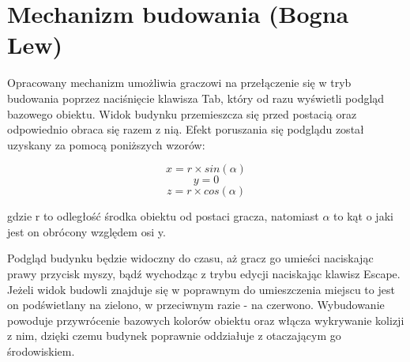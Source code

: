 \section{Mechanizm budowania (Bogna Lew)}

Opracowany mechanizm umożliwia graczowi na przełączenie się w tryb budowania poprzez naciśnięcie klawisza Tab, który od razu
wyświetli podgląd bazowego obiektu. Widok budynku przemieszcza się przed postacią oraz odpowiednio obraca się razem z
nią. Efekt poruszania się podglądu został uzyskany za pomocą poniższych wzorów:

$$ x = r \times sin(\alpha) $$
$$ y = 0 $$
$$ z = r \times cos(\alpha) $$

gdzie r to odległość środka obiektu od postaci gracza, natomiast $\alpha$ to kąt o jaki jest on obrócony względem osi y.

Podgląd budynku będzie widoczny do czasu, aż gracz go umieści naciskając prawy przycisk myszy, bądź wychodząc z trybu
edycji naciskając klawisz Escape. Jeżeli widok budowli znajduje się w poprawnym do umieszczenia miejscu to jest on
podświetlany na zielono, w przeciwnym razie - na czerwono. Wybudowanie powoduje przywrócenie bazowych kolorów obiektu
oraz włącza wykrywanie kolizji z nim, dzięki czemu budynek poprawnie oddziałuje z otaczającym go środowiskiem.
